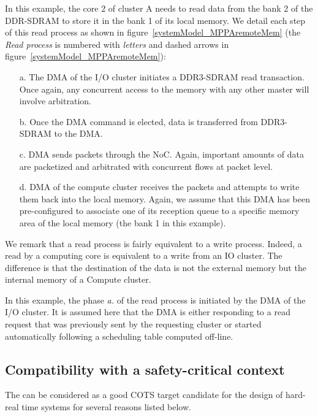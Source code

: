 \documentclass[main.tex]{subfiles}
\begin{document}
\begin{example}
    In this example, the core 2 of cluster A needs to read data from the bank 2 of the DDR-SDRAM to store it in the bank 1 of its local memory. We detail each step of this read process as shown in figure~\ref{systemModel_MPPAremoteMem} (the \emph{Read process} is numbered with \emph{letters} and dashed arrows in figure~\ref{systemModel_MPPAremoteMem}):

\begin{enumerate}
    \item[a.] The DMA of the I/O cluster initiates a DDR3-SDRAM read transaction. Once again, any concurrent access to the memory with any other master will involve arbitration.
    \item[b.] Once the DMA command is elected, data is transferred from DDR3-SDRAM to the DMA.
    \item[c.] DMA sends packets through the NoC. Again, important amounts of data are packetized and arbitrated with concurrent flows at packet level.
    \item[d.] DMA of the compute cluster receives the packets and attempts to write them back into the local memory. Again, we assume that this DMA has been pre-configured to associate one of its reception queue to a specific memory area of the local memory (the bank 1 in this example). 
\end{enumerate}

    We remark that a read process is fairly equivalent to a write process. Indeed, a read by a computing core is equivalent to a write from an IO cluster. The difference is that the destination of the data is not the external memory but the internal memory of a Compute cluster.

    In this example, the phase \emph{a.} of the read process is initiated by the DMA of the I/O cluster. It is assumed here that the DMA is either responding to a read request that was previously sent by the requesting cluster or started automatically following a scheduling table computed off-line.
\end{example}





\subsection{Compatibility with a safety-critical context}
The \mppalong can be considered as a good COTS target candidate for the design of hard-real time systems for several reasons listed below. 
\end{document}
